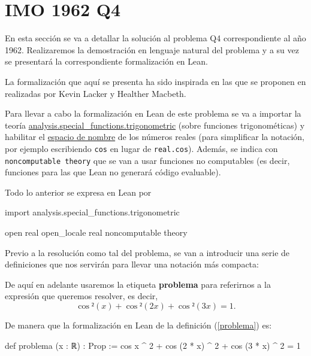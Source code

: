 \section{IMO 1962 Q4}

En esta sección se va a detallar la solución al problema Q4
correspondiente al año 1962. Realizaremos la demostración en lenguaje
natural del problema y a su vez se presentará la correspondiente
formalización en Lean.

La formalización que aquí se presenta ha sido inspirada en
las que se proponen en \cite{KLHM} realizadas por Kevin Lacker y
Healther Macbeth.

\noindent
{}

Para llevar a cabo la formalización en Lean de este problema se va a
importar la teoría
\href{https://github.com/leanprover-community/mathlib/blob/master/src/analysis/special_functions/trigonometric.lean}{analysis.special\_functions.trigonometric}
(sobre funciones trigonométicas) y habilitar el
\href{https://leanprover.github.io/reference/other_commands.html#namespaces}{espacio
de nombre} de los números reales (para simplificar la notación, por
ejemplo escribiendo \texttt{cos} en lugar de \texttt{real.cos}). Además,
se indica con \texttt{noncomputable theory} que se van a usar funciones
no computables (es decir, funciones para las que Lean no generará código
evaluable).

Todo lo anterior se expresa en Lean por
\begin{leancode}
import analysis.special_functions.trigonometric

open real
open_locale real
noncomputable theory
\end{leancode}

Previo a la resolución como tal del problema, se van a introducir
una serie de definiciones que nos servirán para llevar una notación
más compacta:

\begin{definicion}\label{problema}
  De aquí en adelante usaremos la etiqueta \textbf{problema}
  para referirnos a la expresión que queremos resolver,
  es decir,
  \begin{equation}\label{expresionprob}
    \cos²(x)+\cos²(2x)+\cos²(3x)=1.
  \end{equation}
\end{definicion}

De manera que la formalización en Lean de la definición
(\ref{problema}) es:
\begin{leancode}
def problema (x : ℝ) : Prop :=
cos x ^ 2 + cos (2 * x) ^ 2 + cos (3 * x) ^ 2 = 1
\end{leancode}

